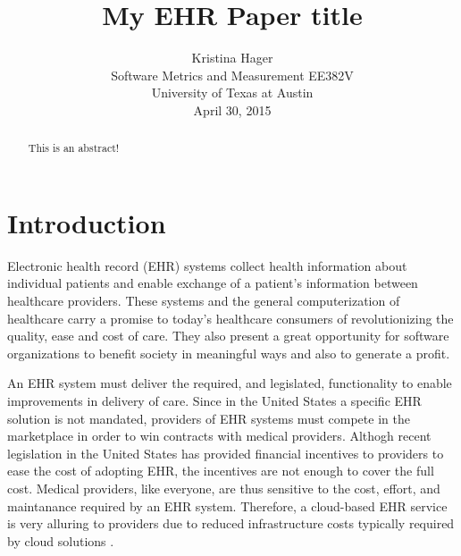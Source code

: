 \documentclass[10pt]{article}
\begin{document}
\title{My EHR Paper title}

\author{Kristina Hager\\
Software Metrics and Measurement EE382V\\
University of Texas at Austin\\
April 30, 2015\\
}

\maketitle
\thispagestyle{empty}

\begin{abstract}
	This is an abstract!
\end{abstract}


\section{Introduction}
\label{Introduction}

Electronic health record (EHR) systems collect health information about individual patients 
and enable exchange of a patient's information between healthcare providers.
These systems and the general computerization of healthcare carry a promise to today's healthcare consumers
of revolutionizing the quality, ease and cost of care.
They also present a great opportunity for software organizations to benefit society in meaningful ways
and also to generate a profit.

An EHR system must deliver the required, and legislated, functionality to enable improvements in delivery of care.
Since in the United States a specific EHR solution is not mandated, providers of EHR systems must compete in the marketplace
in order to win contracts with medical providers.
Althogh recent legislation in the United States has provided financial incentives to providers to ease the cost of adopting EHR,
the incentives are not enough to cover the full cost.
Medical providers, like everyone, are thus sensitive to the cost, effort, and maintanance required by an EHR system.
Therefore, a cloud-based EHR service is very alluring to providers due to reduced infrastructure costs typically required by cloud solutions \cite{auditingprivacy}.
% 
\end{document}
